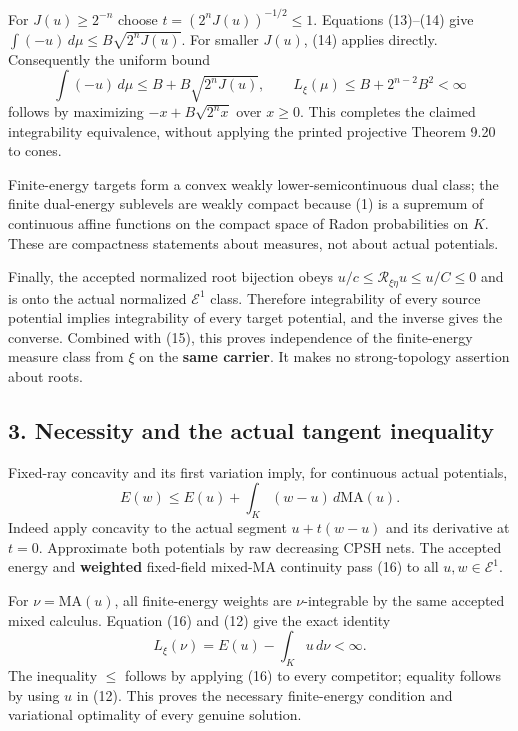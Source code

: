 \documentclass[
  10pt,
]{article}
\begin{document}
For \(J(u)\geq2^{-n}\) choose \(t=(2^nJ(u))^{-1/2}\leq1\). Equations
(13)--(14) give \(\int(-u)\,d\mu\leq B\sqrt{2^nJ(u)}\). For smaller
\(J(u)\), (14) applies directly. Consequently the uniform bound \[
 \int(-u)\,d\mu\leq B+B\sqrt{2^nJ(u)},\qquad
 L_\xi(\mu)\leq B+2^{n-2}B^2<\infty                                 \tag{15}
\] follows by maximizing \(-x+B\sqrt{2^nx}\) over \(x\geq0\). This
completes the claimed integrability equivalence, without applying the
printed projective Theorem 9.20 to cones.

Finite-energy targets form a convex weakly lower-semicontinuous dual
class; the finite dual-energy sublevels are weakly compact because (1)
is a supremum of continuous affine functions on the compact space of
Radon probabilities on \(K\). These are compactness statements about
measures, not about actual potentials.

Finally, the accepted normalized root bijection obeys
\(u/c\leq\mathcal R_{\xi\eta}u\leq u/C\leq0\) and is onto the actual
normalized \(\mathcal E^1\) class. Therefore integrability of every
source potential implies integrability of every target potential, and
the inverse gives the converse. Combined with (15), this proves
independence of the finite-energy measure class from \(\xi\) on the
\textbf{same carrier}. It makes no strong-topology assertion about
roots.

\subsection{3. Necessity and the actual tangent
inequality}\label{necessity-and-the-actual-tangent-inequality}

Fixed-ray concavity and its first variation imply, for continuous actual
potentials, \[
 E(w)\leq E(u)+\int_K(w-u)\,d\mathrm{MA}(u).                           \tag{16}
\] Indeed apply concavity to the actual segment \(u+t(w-u)\) and its
derivative at \(t=0\). Approximate both potentials by raw decreasing
CPSH nets. The accepted energy and \textbf{weighted} fixed-field
mixed-MA continuity pass (16) to all \(u,w\in\mathcal E^1\).

For \(\nu=\mathrm{MA}(u)\), all finite-energy weights are
\(\nu\)-integrable by the same accepted mixed calculus. Equation (16)
and (12) give the exact identity \[
              L_\xi(\nu)=E(u)-\int_Ku\,d\nu<\infty.                  \tag{17}
\] The inequality \(\leq\) follows by applying (16) to every competitor;
equality follows by using \(u\) in (12). This proves the necessary
finite-energy condition and variational optimality of every genuine
solution.
\end{document}
